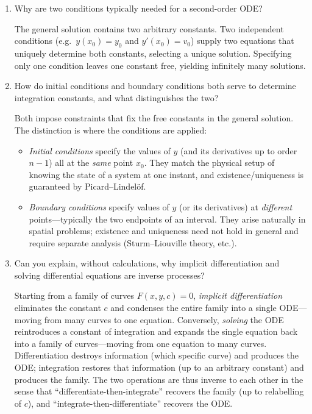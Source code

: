 \documentclass{essay}
\begin{document}
\begin{enumerate}[leftmargin=*, itemsep=8pt]
  \item Why are two conditions typically needed for a second-order ODE?

    \begin{answer} The general solution contains two arbitrary
      constants.  Two independent conditions (e.g.\ $y(x_0)=y_0$ and
      $y'(x_0)=v_0$) supply two equations that uniquely determine both
      constants, selecting a unique solution.  Specifying only one
      condition leaves one constant free, yielding infinitely many solutions.
    \end{answer}

  \item How do initial conditions and boundary conditions both serve
    to determine integration constants, and what distinguishes the two?

    \begin{answer} Both impose constraints that fix the free
      constants in the general solution.  The distinction is where the
      conditions are applied:
      \begin{itemize}
        \item \emph{Initial conditions} specify the values of $y$ (and
          its derivatives up to order $n-1$) all at the \emph{same}
          point $x_0$.  They match the physical setup of knowing the
          state of a system at one instant, and existence/uniqueness is
          guaranteed by Picard--Lindelöf.
        \item \emph{Boundary conditions} specify values of $y$ (or its
          derivatives) at \emph{different} points---typically the two
          endpoints of an interval.  They arise naturally in spatial
          problems; existence and uniqueness need not hold in general
          and require separate analysis (Sturm--Liouville theory, etc.).
      \end{itemize}
    \end{answer}

  \item Can you explain, without calculations, why implicit
    differentiation and solving differential equations are inverse processes?

    \begin{answer} Starting from a family of curves $F(x,y,c)=0$,
      \emph{implicit differentiation} eliminates the constant $c$ and
      condenses the entire family into a single ODE---moving from many
      curves to one equation.  Conversely, \emph{solving} the ODE
      reintroduces a constant of integration and expands the single
      equation back into a family of curves---moving from one equation
      to many curves.  Differentiation destroys information (which
      specific curve) and produces the ODE; integration restores that
      information (up to an arbitrary constant) and produces the
      family.  The two operations are thus inverse to each other in the
      sense that ``differentiate-then-integrate'' recovers the family
      (up to relabelling of $c$), and ``integrate-then-differentiate''
      recovers the ODE.
    \end{answer}

\end{enumerate}
\end{document}
